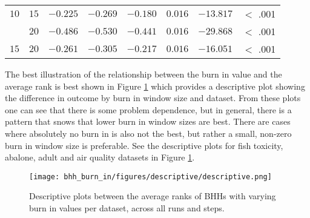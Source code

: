 \begin{table}[htbp]
{\begin{tabular}{lrrrrrrr}
                  $10$                 & $15$                 & $-0.225$             & $-0.269$                                        & $-0.180$             & $0.016$              & $-13.817$            & $<$ .001    \\
                  $ $                  & $20$                 & $-0.486$             & $-0.530$                                        & $-0.441$             & $0.016$              & $-29.868$            & $<$ .001    \\
                  $15$                 & $20$                 & $-0.261$             & $-0.305$                                        & $-0.217$             & $0.016$              & $-16.051$            & $<$ .001    \\
                  \bottomrule
            \end{tabular}
      }
\end{table}

The best illustration of the relationship between the burn in value and the average rank is best shown in Figure \ref{fig:results:burn_in:descriptive:descriptive} which provides a descriptive plot showing the difference in outcome by burn in window size and dataset. From these plots one can see that there is some problem dependence, but in general, there is a pattern that snows that lower burn in window sizes are best. There are cases where absolutely no burn in is also not the best, but rather a small, non-zero burn in window size is preferable. See the descriptive plots for fish toxicity, abalone, adult and air quality datasets in Figure \ref{fig:results:burn_in:descriptive:descriptive}.


\begin{figure}[htbp]
      \centering
      \texttt{[image: bhh\_burn\_in/figures/descriptive/descriptive.png]}
      \caption{Descriptive plots between the average ranks of \Acsp{BHH} with varying burn in values per dataset, across all runs and steps.}
      \label{fig:results:burn_in:descriptive:descriptive}
\end{figure}

